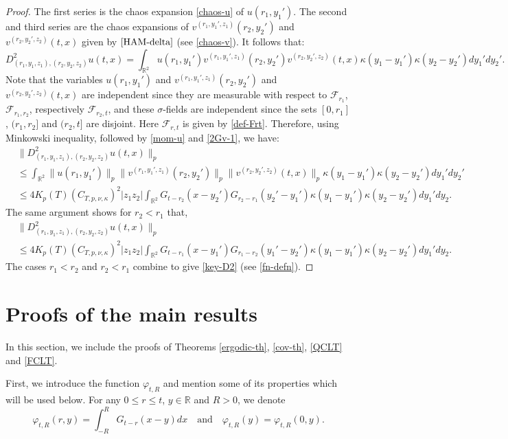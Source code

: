 \documentclass[12pt]{article}
\def\cF{\mathcal{F}}
\def\bR{\mathbb{R}}
\def\k{\kappa}
\begin{document}
\begin{proof}
The first series is the chaos expansion \eqref{chaos-u} of $u(r_1,y_1')$. The second and third series are the chaos expansions of $v^{(r_1,y_1',z_1)}(r_2,y_2')$ and $v^{(r_2,y_2',z_2)}(t,x)$ given by $\eqref{HAM-delta}$ (see \eqref{chaos-v}). It follows that: 
\[
D^2_{(r_1,y_1,z_1),(r_2,y_2,z_2)}u(t,x)=\int_{\bR^2} u(r_1,y_1')v^{(r_1,y_1',z_1)}(r_2,y_2')v^{(r_2,y_2',z_2)}(t,x)\k(y_1-y_1') \k(y_2-y_2')dy_1' dy_2'.
\]
Note that the variables $u(r_1,y_1')$ and $v^{(r_1,y_1',z_1)}(r_2,y_2')$ and $v^{(r_2,y_2',z_2)}(t,x)$ are independent since they are measurable with respect to $\cF_{r_1}$, $\cF_{r_1,r_2}$, respectively $\cF_{r_2,t}$, and these $\sigma$-fields are independent since the sets $[0,r_1]$, $(r_1,r_2]$ and $(r_2,t]$ are disjoint. Here $\cF_{r,t}$ is given by \eqref{def-Frt}.
Therefore, using Minkowski inequality, followed by \eqref{mom-u} and \eqref{2Gv-1}, we have:
\begin{align*}
& \|D^2_{(r_1,y_1,z_1),(r_2,y_2,z_2)}u(t,x)\|_p 
\\
& \leq \int_{\bR^2} \|u(r_1,y_1')\|_p\|v^{(r_1,y_1',z_1)}(r_2,y_2')\|_p\|v^{(r_2,y_2',z_2)}(t,x)\|_p\k(y_1-y_1') \k(y_2-y_2') dy_1' dy_2'
\\
& \leq 4 K_p(T) (C_{T,p,\nu,\k})^2|z_1z_2|\int_{\bR^2}G_{t-r_2}(x-y_2')G_{r_2-r_1}(y_2'-y_1') \k(y_1-y_1') \k(y_2-y_2') dy_1' dy_2.
\end{align*}
The same argument shows for $r_2 < r_1$ that, 
\begin{align*}
 & \|D^2_{(r_1,y_1,z_1),(r_2,y_2,z_2)}u(t,x)\|_p  
 \\
 & \leq 4 K_p(T) (C_{T,p,\nu,\k})^2|z_1z_2|\int_{\bR^2}G_{t-r_1}(x-y_1')G_{r_1-r_2}(y_1'-y_2') \k(y_1-y_1') \k(y_2-y_2') dy_1' dy_2.
\end{align*}
The cases $r_1 < r_2$ and $r_2 < r_1$ combine to give \eqref{key-D2} (see \eqref{fn-defn}). 
\end{proof}

\section{Proofs of the main results}
\label{section-proofs}

In this section, we include the proofs of Theorems \ref{ergodic-th}, \ref{cov-th}, \ref{QCLT} and \ref{FCLT}.

\medskip

First, we introduce the function $\varphi_{t,R}$ and mention some of its properties which will be used below.
For any $0\leq r \leq t$, $y \in \bR$ and $R>0$, we denote
\begin{equation}
\label{def-phi-tR}
\varphi_{t,R}(r,y)=\int_{-R}^R G_{t-r}(x-y)dx \quad \mbox{and} \quad \varphi_{t,R}(y)=\varphi_{t,R}(0,y).
\end{equation}
\end{document}
